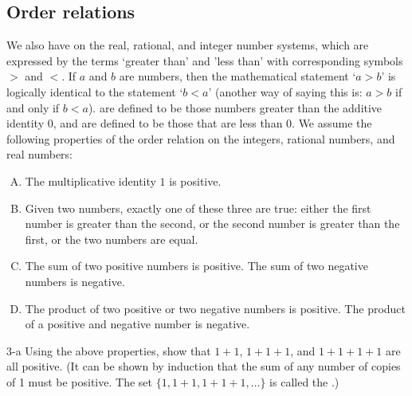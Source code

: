 

\subsection{Order relations}\label{subsec:orderprop}
We also have  on the real, rational, and integer number systems, which are expressed by the terms `greater than'  and 'less than' with corresponding symbols $>$ and $<$. If $a$ and $b$ are numbers, then  the mathematical statement `$a > b$' is logically identical to the statement  `$b<a$' (another way of saying this is: $a > b$ if and only if $b < a$).  are defined to be those numbers greater than the additive identity 0, and  are defined to be those that  are less than 0. We assume the following properties of the order relation on the integers, rational numbers, and real numbers:

\begin{enumerate}[(A)] 
\item
The multiplicative identity $1$ is positive.
\item
Given two numbers, exactly one of these three are true: either the first number is greater than the second, or the second number is greater than the first, or the two numbers are equal.
\item
The sum of two  positive numbers  is positive. The sum of two negative numbers is negative.
\item
The product of two  positive or two negative numbers is positive. The product of a positive and negative number is negative.
\end{enumerate}

\begin{exercise}{3-a}
Using the above properties, show that $1+1$, $1+1+1$, and $1+1+1+1$ are all positive. (It can be shown by induction that the sum of any number of copies of 1 must be positive. The set $\{1, 1+1, 1+1+1, \ldots\}$ is called the .)
\end{exercise}


